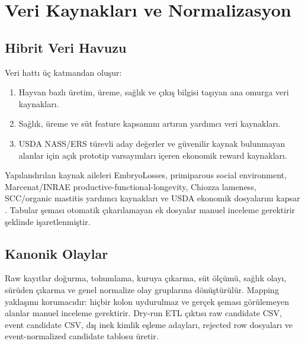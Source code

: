 \documentclass[conference]{IEEEtran}
\begin{document}
\section{Veri Kaynakları ve Normalizasyon}
\subsection{Hibrit Veri Havuzu}
Veri hattı üç katmandan oluşur:
\begin{enumerate}
    \item Hayvan bazlı üretim, üreme, sağlık ve çıkış bilgisi taşıyan ana omurga
    veri kaynakları.
    \item Sağlık, üreme ve süt feature kapsamını artıran yardımcı veri
    kaynakları.
    \item USDA NASS/ERS türevli aday değerler ve güvenilir kaynak bulunmayan
    alanlar için açık prototip varsayımları içeren ekonomik reward kaynakları.
\end{enumerate}

Yapılandırılan kaynak aileleri EmbryoLosses, primiparous social environment,
Marcenat/INRAE productive-functional-longevity, Chiozza lameness, SCC/organic
mastitis yardımcı kaynakları ve USDA ekonomik dosyalarını kapsar \cite{datasets}.
Tabular şeması otomatik çıkarılamayan ek dosyalar manuel inceleme gerektirir
şeklinde işaretlenmiştir.

\subsection{Kanonik Olaylar}
Raw kayıtlar doğurma, tohumlama, kuruya çıkarma, süt ölçümü, sağlık olayı,
sürüden çıkarma ve genel normalize olay gruplarına dönüştürülür. Mapping
yaklaşımı korumacıdır: hiçbir kolon uydurulmaz ve gerçek şeması görülemeyen
alanlar manuel inceleme gerektirir. Dry-run ETL çıktısı raw candidate CSV,
event candidate CSV, dış inek kimlik eşleme adayları, rejected row dosyaları ve
event-normalized candidate tablosu üretir.
\end{document}
